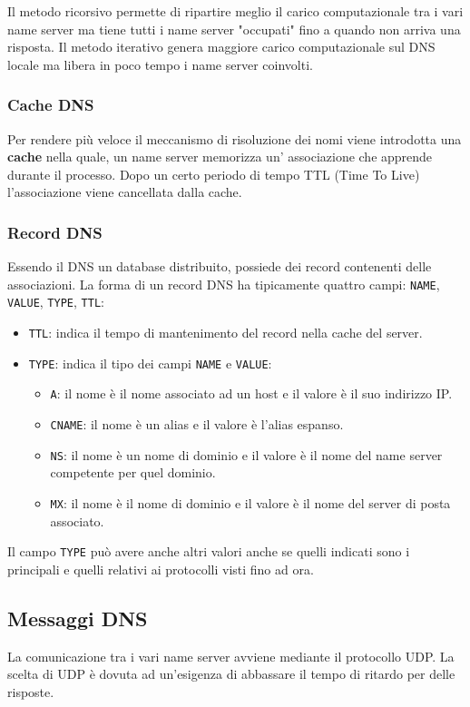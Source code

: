 Il metodo ricorsivo permette di ripartire meglio il carico 
computazionale tra i vari name server ma tiene tutti i name server 
"occupati" fino a quando non arriva una risposta. Il metodo iterativo
genera maggiore carico computazionale sul DNS locale ma libera in poco 
tempo i name server coinvolti.

\subsubsection{Cache DNS}
Per rendere più veloce il meccanismo di risoluzione dei nomi viene 
introdotta una \textbf{cache} nella quale, un name server memorizza un'
associazione che apprende durante il processo. Dopo un certo periodo di
tempo TTL (Time To Live) l'associazione viene cancellata dalla cache.

\subsubsection{Record DNS}
Essendo il DNS un database distribuito, possiede dei record contenenti 
delle associazioni. La forma di un record DNS ha tipicamente quattro 
campi: \verb|NAME|, \verb|VALUE|, \verb|TYPE|, \verb|TTL|:
\begin{itemize}
	\item \verb|TTL|: indica il tempo di mantenimento del record nella 
		cache del server.
	\item \verb|TYPE|: indica il tipo dei campi \verb|NAME| e 
		\verb|VALUE|:
	      \begin{itemize}
		      \item \verb|A|: il nome è il nome associato ad un host 
				  e il valore è il suo indirizzo IP.
		      \item \verb|CNAME|: il nome è un alias e il valore è 
				  l'alias espanso.
		      \item \verb|NS|: il nome è un nome di dominio e il valore
				  è il nome del name server competente per quel 
				  dominio.
		      \item \verb|MX|: il nome è il nome di dominio e il valore
				  è il nome del server di posta associato.
	      \end{itemize}
\end{itemize}
Il campo \verb|TYPE| può avere anche altri valori anche se quelli
indicati sono i principali e quelli relativi ai protocolli visti fino 
ad ora.

\subsection{Messaggi DNS}
La comunicazione tra i vari name server avviene mediante il protocollo 
UDP.  La scelta di UDP è dovuta ad un'esigenza di abbassare il tempo di
ritardo per delle risposte.

